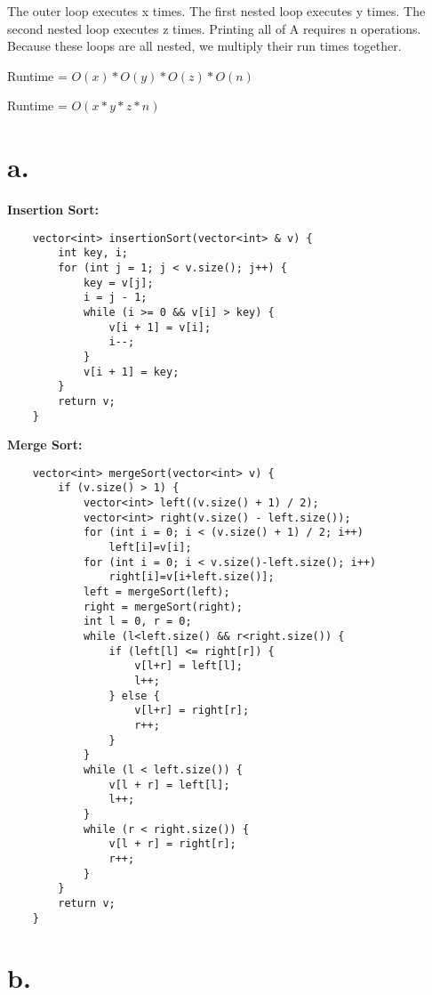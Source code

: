 \documentclass[10pt, a4paper]{article}
\begin{document}
\begin{enumerate}
\begin{lstlisting}
  \end{lstlisting}

  The outer loop executes x times. The first nested loop executes y times. 
    The second nested loop executes z times. Printing all of A requires n operations.
    Because these loops are all nested, we multiply their run times together. 

  Runtime = $ O(x) * O(y) * O(z) * O(n) $

  Runtime = $ O(x * y * z * n) $

    \section{a.}

  \textbf{Insertion Sort: }
  \begin{lstlisting}
    vector<int> insertionSort(vector<int> & v) {
        int key, i;
        for (int j = 1; j < v.size(); j++) {
            key = v[j];
            i = j - 1;
            while (i >= 0 && v[i] > key) {
                v[i + 1] = v[i];
                i--;
            }
            v[i + 1] = key;
        }
        return v;
    }
  \end{lstlisting}

  \textbf{Merge Sort:}
  \begin{lstlisting}
    vector<int> mergeSort(vector<int> v) {
        if (v.size() > 1) {
            vector<int> left((v.size() + 1) / 2);
            vector<int> right(v.size() - left.size());
            for (int i = 0; i < (v.size() + 1) / 2; i++) 
                left[i]=v[i];
            for (int i = 0; i < v.size()-left.size(); i++) 
                right[i]=v[i+left.size()];
            left = mergeSort(left);
            right = mergeSort(right);   
            int l = 0, r = 0;
            while (l<left.size() && r<right.size()) {
                if (left[l] <= right[r]) {
                    v[l+r] = left[l];
                    l++;
                } else {
                    v[l+r] = right[r];
                    r++;
                }
            }
            while (l < left.size()) {
                v[l + r] = left[l];
                l++;
            }
            while (r < right.size()) {
                v[l + r] = right[r];
                r++;
            }
        }
        return v;
    }
  \end{lstlisting}

  \section{b.}


\end{enumerate}
\end{document}
